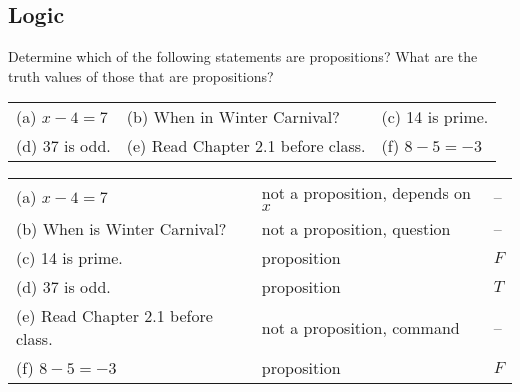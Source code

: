\begin{questions}

\section*{Logic}

 Determine which of the following statements are propositions? What are the truth values of those that are propositions? \\
\begin{tabular}{lll}
    (a) $x - 4 = 7$ \hspace*{0.5in}
     & (b)  When in Winter Carnival? \hspace*{0.5in}
     & (c) 14 is prime. \\
	(d) 37 is odd. 		
	 & (e) Read Chapter 2.1 before class. 
	 & (f) $8 - 5 = -3$ \\	
\end{tabular}
	\ifprintanswers
        \vspace{-5pt}
    \fi
	\begin{solution}
		\begin{tabular}{lll}	
			(a) $x - 4 = 7$						
                & not a proposition, depends on $x$ \hspace*{0.25in} & -- \\
			(b) When is Winter Carnival? 
                & not a proposition, question & -- \\
			(c) 14 is prime.  
                & proposition 			       & $F$ \\
            (d) 37 is odd.                      
                &  proposition                 & $T$ \\
            (e)  Read Chapter 2.1 before class. \hspace*{0.3in}   
                & not a proposition, command   & -- \\
            (f) $8 - 5 = -3$                        
                & proposition                  & $F$ \\
		\end{tabular}
	\end{solution}




\end{questions}
